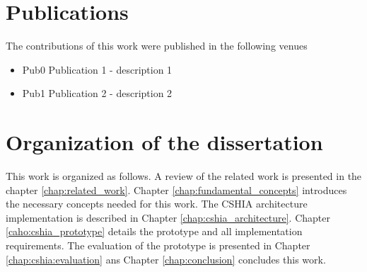 \section{Publications}
\label{sec:publications}
The contributions of this work were published  in the following venues 
\begin{itemize}
\item{Pub0} Publication 1  - description 1
\item{Pub1} Publication 2 - description 2
\end{itemize}

\section{Organization of the dissertation}
\label{sec:organization_of_dissertation}
This work is organized as follows.  A review of the related work is presented in the chapter \ref{chap:related_work}. Chapter \ref{chap:fundamental_concepts} introduces the necessary concepts  needed for this work. The CSHIA architecture implementation is described in Chapter \ref{chap:cshia_architecture}. Chapter \ref{caho:cshia_prototype} details the prototype and all implementation requirements. The evaluation of the prototype is presented in Chapter \ref{chap:cshia:evaluation} ans Chapter \ref{chap:conclusion} concludes this work.


